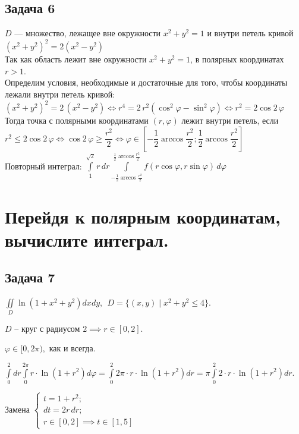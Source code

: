 \documentclass[a4paper, fleqn]{article}
\begin{document}
    
    
    \subsection*{Задача 6}
    $D$ --- множество, лежащее вне окружности $x^2 + y^2 = 1$ и внутри петель кривой $(x^2 + y^2)^2 = 2(x^2 - y^2)$ \\[5 pt]
    Так как область лежит вне окружности $x^2 + y^2 = 1$, в полярных координатах $r > 1$. \\[3 pt]
    Определим условия, необходимые и достаточные для того, чтобы координаты лежали внутри петель кривой: \\[3 pt]
    $(x^2 + y^2)^2 = 2\, (x^2 - y^2) \Leftrightarrow r^4 = 2\, r^2 (\cos^2 \varphi - \sin^2 \varphi)
     \Leftrightarrow r^2 = 2 \cos 2\, \varphi$ \\[5 pt]
     Тогда точка с полярными координатами $(r, \varphi)$ лежит внутри петель, если 
     $r^2 \le 2 \cos 2\, \varphi \Leftrightarrow \cos 2\, \varphi \ge \dfrac{r^2}2 \Leftrightarrow 
     \varphi \in \left[ -\dfrac12\arccos \dfrac{r^2}2; \dfrac12\arccos \dfrac{r^2}2 \right]$ \\
     Повторный интеграл:
     $\int\limits_{1}^{\sqrt2} r\, dr \int\limits_{-\frac12\arccos \frac{r^2}2}^{\frac12\arccos \frac{r^2}2} f(r \cos \varphi, r \sin \varphi)\, d\varphi$
    
    \section*{Перейдя к полярным координатам, вычислите интеграл.}
    \subsection*{Задача 7}
    
    $\displaystyle \iint\limits_{D} \ln (1 + x^2 + y^2) dx dy, \; \, D = \{(x,y) \mid x^2 + y^2 \leq 4 \} .$
    
    $D$ -- круг с радиусом $2 \implies r \in [0,2]$.
    
    $\varphi \in [0, 2 \pi),$ как и всегда.
    
    $\displaystyle \int\limits_{0}^{2} dr \int\limits_{0}^{2 \pi} r \cdot \ln(1 + r^2) d \varphi = \int\limits_{0}^{2} 2 \pi \cdot r \cdot \ln(1 + r^2) dr =  \pi \int\limits_{0}^{2} 2  \cdot r \cdot \ln(1 + r^2) dr.$
    
    Замена $\begin{cases} t = 1 + r^2;\\
    dt = 2r \, dr;\\
    r \in [0, 2] \implies t \in [1,5] \end{cases}$
    
\end{document}
